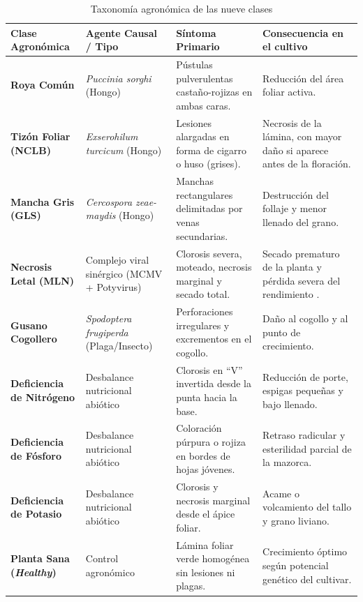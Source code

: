 \begin{table}[H]
\caption{Taxonom\'ia agron\'omica de las nueve clases}
\label{tab:taxonomia}
\centering
\small
\begin{singlespace}
\begin{tabularx}{\textwidth}{>{\raggedright\arraybackslash}p{3.0cm}>{\raggedright\arraybackslash}p{3.9cm}>{\raggedright\arraybackslash}X>{\raggedright\arraybackslash}p{4.2cm}}
\toprule
\textbf{Clase Agron\'omica} & \textbf{Agente Causal / Tipo} & \textbf{S\'intoma Primario} & \textbf{Consecuencia en el cultivo} \\
\midrule
\textbf{Roya Com\'un} & \textit{Puccinia sorghi} (Hongo) & P\'ustulas pulverulentas casta\~no-rojizas en ambas caras. & Reducci\'on del \'area foliar activa. \\
\textbf{Tiz\'on Foliar (NCLB)} & \textit{Exserohilum turcicum} (Hongo) & Lesiones alargadas en forma de cigarro o huso (grises). & Necrosis de la l\'amina, con mayor da\~no si aparece antes de la floraci\'on. \\
\textbf{Mancha Gris (GLS)} & \textit{Cercospora zeae-maydis} (Hongo) & Manchas rectangulares delimitadas por venas secundarias. & Destrucci\'on del follaje y menor llenado del grano. \\
\textbf{Necrosis Letal (MLN)} & Complejo viral sin\'ergico (MCMV + Potyvirus) & Clorosis severa, moteado, necrosis marginal y secado total. & Secado prematuro de la planta y p\'erdida severa del rendimiento \cite{mahuku2015}. \\
\textbf{Gusano Cogollero} & \textit{Spodoptera frugiperda} (Plaga/Insecto) & Perforaciones irregulares y excrementos en el cogollo. & Da\~no al cogollo y al punto de crecimiento. \\
\textbf{Deficiencia de Nitr\'ogeno} & Desbalance nutricional abi\'otico & Clorosis en ``V'' invertida desde la punta hacia la base. & Reducci\'on de porte, espigas peque\~nas y bajo llenado. \\
\textbf{Deficiencia de F\'osforo} & Desbalance nutricional abi\'otico & Coloraci\'on p\'urpura o rojiza en bordes de hojas j\'ovenes. & Retraso radicular y esterilidad parcial de la mazorca. \\
\textbf{Deficiencia de Potasio} & Desbalance nutricional abi\'otico & Clorosis y necrosis marginal desde el \'apice foliar. & Acame o volcamiento del tallo y grano liviano. \\
\textbf{Planta Sana (\textit{Healthy})} & Control agron\'omico & L\'amina foliar verde homog\'enea sin lesiones ni plagas. & Crecimiento \'optimo seg\'un potencial gen\'etico del cultivar. \\
\bottomrule
\end{tabularx}
\end{singlespace}
\end{table}

